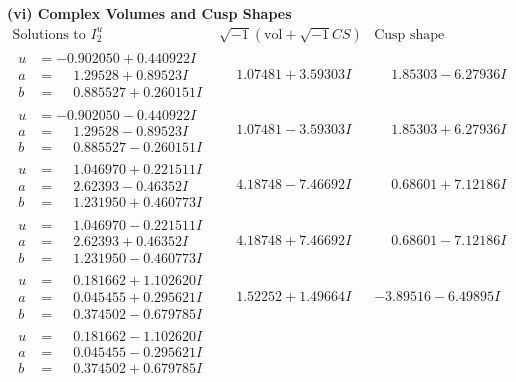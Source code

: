 \documentclass[1p]{elsarticle_modified}
\theoremstyle{definition}
\newcommand{\I}{\sqrt{-1}}
\begin{document}
\newpage\flushleft \textbf{(vi) Complex Volumes and Cusp Shapes}
$$\begin{array}{c|c|c}  
\text{Solutions to }I^u_{2}& \I (\text{vol} + \sqrt{-1}CS) & \text{Cusp shape}\\
 \hline 
\begin{aligned}
u &= -0.902050 + 0.440922 I \\
a &= \phantom{-}1.29528 + 0.89523 I \\
b &= \phantom{-}0.885527 + 0.260151 I\end{aligned}
 & \phantom{-}1.07481 + 3.59303 I & \phantom{-}1.85303 - 6.27936 I \\ \hline\begin{aligned}
u &= -0.902050 - 0.440922 I \\
a &= \phantom{-}1.29528 - 0.89523 I \\
b &= \phantom{-}0.885527 - 0.260151 I\end{aligned}
 & \phantom{-}1.07481 - 3.59303 I & \phantom{-}1.85303 + 6.27936 I \\ \hline\begin{aligned}
u &= \phantom{-}1.046970 + 0.221511 I \\
a &= \phantom{-}2.62393 - 0.46352 I \\
b &= \phantom{-}1.231950 + 0.460773 I\end{aligned}
 & \phantom{-}4.18748 - 7.46692 I & \phantom{-}0.68601 + 7.12186 I \\ \hline\begin{aligned}
u &= \phantom{-}1.046970 - 0.221511 I \\
a &= \phantom{-}2.62393 + 0.46352 I \\
b &= \phantom{-}1.231950 - 0.460773 I\end{aligned}
 & \phantom{-}4.18748 + 7.46692 I & \phantom{-}0.68601 - 7.12186 I \\ \hline\begin{aligned}
u &= \phantom{-}0.181662 + 1.102620 I \\
a &= \phantom{-}0.045455 + 0.295621 I \\
b &= \phantom{-}0.374502 - 0.679785 I\end{aligned}
 & \phantom{-}1.52252 + 1.49664 I & -3.89516 - 6.49895 I \\ \hline\begin{aligned}
u &= \phantom{-}0.181662 - 1.102620 I \\
a &= \phantom{-}0.045455 - 0.295621 I \\
b &= \phantom{-}0.374502 + 0.679785 I\end{aligned}

\end{array}$$
\end{document}
